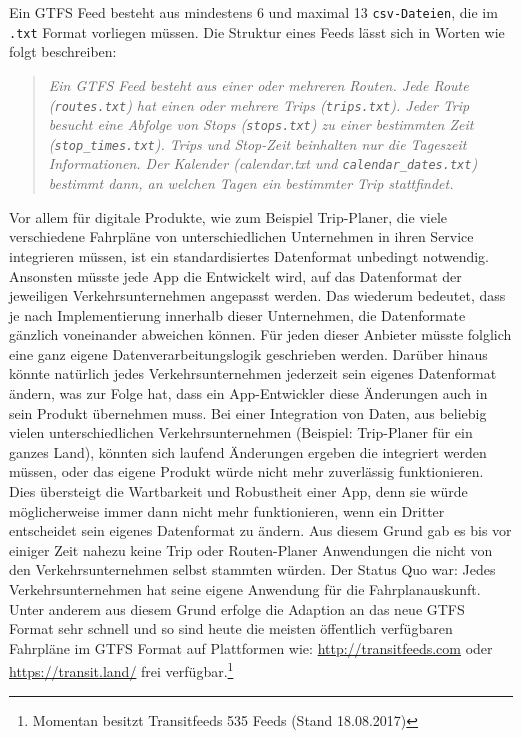 \begin{newpage}
    Ein GTFS Feed besteht aus mindestens 6 und maximal 13 \texttt{csv-Dateien}, die im \texttt{.txt} Format vorliegen müssen. Die Struktur eines Feeds lässt sich in Worten wie folgt beschreiben:

    \begin{quote}
      \textit{Ein GTFS Feed besteht aus einer oder mehreren Routen. Jede Route (\texttt{routes.txt}) hat einen oder mehrere Trips (\texttt{trips.txt}). Jeder Trip besucht eine Abfolge von Stops (\texttt{stops.txt}) zu einer bestimmten Zeit (\texttt{stop\_times.txt}). Trips und Stop-Zeit beinhalten nur die Tageszeit Informationen. Der Kalender (calendar.txt und \texttt{calendar\_dates.txt}) bestimmt dann, an welchen Tagen ein bestimmter Trip stattfindet.} \cite[S. 8]{zervaas}
    \end{quote}

		Vor allem für digitale Produkte, wie zum Beispiel Trip-Planer, die viele verschiedene Fahrpläne von unterschiedlichen Unternehmen in ihren Service integrieren müssen, ist ein standardisiertes Datenformat unbedingt notwendig. 
		Ansonsten müsste jede App die Entwickelt wird, auf das Datenformat der jeweiligen Verkehrsunternehmen angepasst werden. Das wiederum bedeutet, dass je nach Implementierung innerhalb dieser Unternehmen, die Datenformate gänzlich voneinander abweichen können. Für jeden dieser Anbieter müsste folglich eine ganz eigene Datenverarbeitungslogik geschrieben werden.
    Darüber hinaus könnte natürlich jedes Verkehrsunternehmen jederzeit sein eigenes Datenformat ändern, was zur Folge hat, dass ein App-Entwickler diese Änderungen auch in sein Produkt übernehmen muss. Bei einer Integration von Daten, aus beliebig vielen unterschiedlichen Verkehrsunternehmen (Beispiel: Trip-Planer für ein ganzes Land), könnten sich laufend Änderungen ergeben die integriert werden müssen, oder das eigene Produkt würde nicht mehr zuverlässig funktionieren. Dies übersteigt die Wartbarkeit und Robustheit einer App, denn sie würde möglicherweise immer dann nicht mehr funktionieren, wenn ein Dritter entscheidet sein eigenes Datenformat zu ändern. Aus diesem Grund gab es bis vor einiger Zeit nahezu keine Trip oder Routen-Planer Anwendungen die nicht von den Verkehrsunternehmen selbst stammten würden. Der Status Quo war: Jedes Verkehrsunternehmen hat seine eigene Anwendung für die Fahrplanauskunft. Unter anderem aus diesem Grund erfolge die Adaption an das neue GTFS Format sehr schnell und so sind heute die meisten öffentlich verfügbaren Fahrpläne im GTFS Format auf Plattformen wie: \url{http://transitfeeds.com} oder \url{https://transit.land/} frei verfügbar.\footnote{Momentan besitzt Transitfeeds 535 Feeds (Stand 18.08.2017)}\\


\end{newpage}
